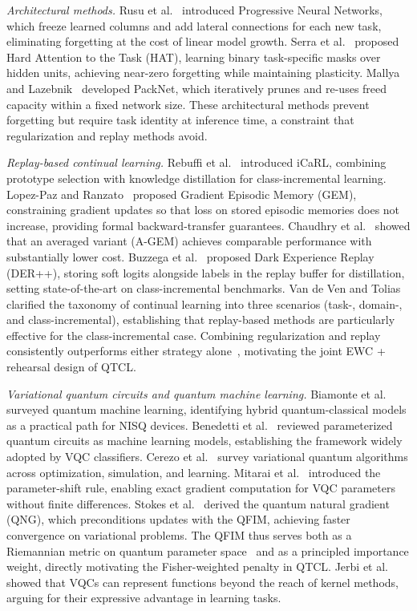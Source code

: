 \documentclass{llncs}
\begin{document}
\noindent\textit{Architectural methods.}
Rusu et al.~\cite{rusu2016progressive} introduced Progressive Neural Networks,
which freeze learned columns and add lateral connections for each new task,
eliminating forgetting at the cost of linear model growth.
Serra et al.~\cite{serra2018overcoming} proposed Hard Attention to the Task
(HAT), learning binary task-specific masks over hidden units, achieving near-zero
forgetting while maintaining plasticity.
Mallya and Lazebnik~\cite{mallya2018packnet} developed PackNet, which
iteratively prunes and re-uses freed capacity within a fixed network size.
These architectural methods prevent forgetting but require task identity at
inference time, a constraint that regularization and replay methods avoid.

\noindent\textit{Replay-based continual learning.}
Rebuffi et al.~\cite{Rebuffi2017} introduced iCaRL, combining prototype
selection with knowledge distillation for class-incremental learning.
Lopez-Paz and Ranzato~\cite{lopezpaz2017gem} proposed Gradient Episodic Memory
(GEM), constraining gradient updates so that loss on stored episodic memories
does not increase, providing formal backward-transfer guarantees.
Chaudhry et al.~\cite{chaudhry2019agem} showed that an averaged variant
(A-GEM) achieves comparable performance with substantially lower cost.
Buzzega et al.~\cite{buzzega2020dark} proposed Dark Experience Replay (DER++),
storing soft logits alongside labels in the replay buffer for distillation,
setting state-of-the-art on class-incremental benchmarks.
Van de Ven and Tolias~\cite{vandeven2019three} clarified the taxonomy of
continual learning into three scenarios (task-, domain-, and class-incremental),
establishing that replay-based methods are particularly effective for the
class-incremental case.
Combining regularization and replay consistently outperforms either strategy
alone~\cite{parisi2019continual}, motivating the joint EWC + rehearsal design
of QTCL.

\noindent\textit{Variational quantum circuits and quantum machine learning.}
Biamonte et al.~\cite{biamonte2017quantum} surveyed quantum machine learning,
identifying hybrid quantum-classical models as a practical path for NISQ devices.
Benedetti et al.~\cite{benedetti2019parameterized} reviewed parameterized quantum
circuits as machine learning models, establishing the framework widely adopted
by VQC classifiers.
Cerezo et al.~\cite{cerezo2021variational} survey variational quantum algorithms
across optimization, simulation, and learning.
Mitarai et al.~\cite{mitarai2018quantum} introduced the parameter-shift rule,
enabling exact gradient computation for VQC parameters without finite differences.
Stokes et al.~\cite{stokes2020quantum} derived the quantum natural gradient (QNG),
which preconditions updates with the QFIM, achieving faster convergence on
variational problems.
The QFIM thus serves both as a Riemannian metric on quantum parameter
space~\cite{haug2021} and as a principled importance weight, directly motivating
the Fisher-weighted penalty in QTCL.
Jerbi et al.~\cite{jerbi2023beyond} showed that VQCs can represent functions
beyond the reach of kernel methods, arguing for their expressive advantage in
learning tasks.
\end{document}
